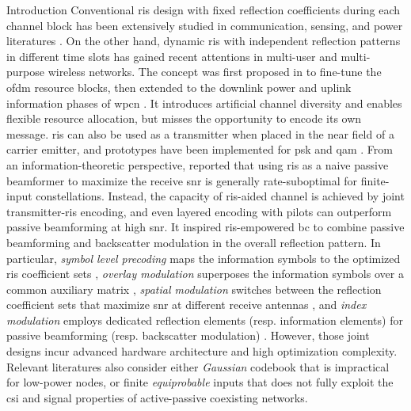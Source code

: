 \documentclass[journal,12pt,onecolumn,draftclsnofoot]{IEEEtran}
\theoremstyle{remark}
\begin{document}
\begin{section}{Introduction}
	Conventional \gls{ris} design with fixed reflection coefficients during each channel block has been extensively studied in communication, sensing, and power literatures \cite{Wu2018,Zhang2019a,Lin2022,Liu2022,Feng2022,Zhao2022}.
	On the other hand, dynamic \gls{ris} with independent reflection patterns in different time slots has gained recent attentions in multi-user and multi-purpose wireless networks.
	The concept was first proposed in \cite{Yang2020} to fine-tune the \gls{ofdm} resource blocks, then extended to the downlink power and uplink information phases of \gls{wpcn} \cite{Wu2021,Wu2021d,Hua2022a}.
	It introduces artificial channel diversity and enables flexible resource allocation, but misses the opportunity to encode its own message.
	\gls{ris} can also be used as a transmitter when placed in the near field of a carrier emitter, and prototypes have been implemented for \gls{psk} \cite{Tang2019a} and \gls{qam} \cite{Dai2020a}.
	From an information-theoretic perspective, \cite{Karasik2020} reported that using \gls{ris} as a naive passive beamformer to maximize the receive \gls{snr} is generally rate-suboptimal for finite-input constellations.
	Instead, the capacity of \gls{ris}-aided channel is achieved by joint transmitter-\gls{ris} encoding, and even layered encoding with pilots can outperform passive beamforming at high \gls{snr}.
	It inspired \gls{ris}-empowered \gls{bc} \cite{Liu2019d,Bereyhi2020,Xu2020b,Zhang2021d,Hu2021b,Hua2022,Basar2020,Ma2020a,Yuan2021,Hu2021a} to combine passive beamforming and backscatter modulation in the overall reflection pattern.
	In particular, \emph{symbol level precoding} maps the information symbols to the optimized \gls{ris} coefficient sets \cite{Liu2019d,Bereyhi2020}, \emph{overlay modulation} superposes the information symbols over a common auxiliary matrix \cite{Xu2020b,Zhang2021d,Hu2021b,Hua2022}, \emph{spatial modulation} switches between the reflection coefficient sets that maximize \gls{snr} at different receive antennas \cite{Basar2020,Ma2020a,Yuan2021}, and \emph{index modulation} employs dedicated reflection elements (resp. information elements) for passive beamforming (resp. backscatter modulation) \cite{Hu2021a}.
	However, those joint designs incur advanced hardware architecture and high optimization complexity.
	Relevant literatures also consider either \emph{Gaussian} codebook \cite{Guo2019b,Ding2020,Long2020a,Zhou2019a,Wu2021a,Xu2021a,Yang2021a,Hu2021b} that is impractical for low-power nodes, or finite \emph{equiprobable} inputs \cite{Yang2018,Liang2020,Han2021,Zhang2022,Liu2019d,Bereyhi2020,Xu2020b,Zhang2021d,Hua2022,Basar2020,Ma2020a,Yuan2021,Hu2021a} that does not fully exploit the \gls{csi} and signal properties of active-passive coexisting networks.


\end{section}
\end{document}
